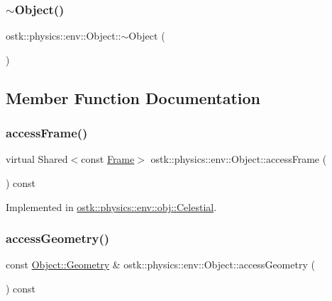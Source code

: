 \subsubsection{\texorpdfstring{$\sim$\+Object()}{~Object()}}
{\footnotesize\ttfamily ostk\+::physics\+::env\+::\+Object\+::$\sim$\+Object (\begin{DoxyParamCaption}{ }\end{DoxyParamCaption})\hspace{0.3cm}{\ttfamily [pure virtual]}}



\subsection{Member Function Documentation}
\mbox{\label{classostk_1_1physics_1_1env_1_1_object_aca93358323c3eb3e4dabf07c33187f14}} 
\subsubsection{\texorpdfstring{access\+Frame()}{accessFrame()}}
{\footnotesize\ttfamily virtual Shared$<$const \hyperlink{classostk_1_1physics_1_1coord_1_1_frame}{Frame}$>$ ostk\+::physics\+::env\+::\+Object\+::access\+Frame (\begin{DoxyParamCaption}{ }\end{DoxyParamCaption}) const\hspace{0.3cm}{\ttfamily [pure virtual]}}



Implemented in \hyperlink{classostk_1_1physics_1_1env_1_1obj_1_1_celestial_a0140fc682a707ec2dc715828e532db79}{ostk\+::physics\+::env\+::obj\+::\+Celestial}.

\mbox{\label{classostk_1_1physics_1_1env_1_1_object_af5556cdc8db2a35e8549b79d481ceada}} 
\subsubsection{\texorpdfstring{access\+Geometry()}{accessGeometry()}}
{\footnotesize\ttfamily const \hyperlink{classostk_1_1physics_1_1env_1_1_object_a66e44a65aefb23a184a6de531e96935d}{Object\+::\+Geometry} \& ostk\+::physics\+::env\+::\+Object\+::access\+Geometry (\begin{DoxyParamCaption}{ }\end{DoxyParamCaption}) const}

